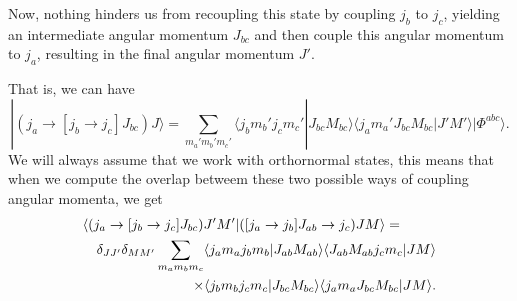 Now, nothing hinders us from recoupling this state by coupling $j_b$ to $j_c$, yielding an intermediate angular momentum $J_{bc}$ and then couple this angular momentum to $j_a$, resulting in the final angular momentum $J'$. 

That is, we can have 
\[
| (j_a\rightarrow [j_b\rightarrow j_c]J_{bc}) J\rangle = \sum_{m_a'm_b'm_c'}\langle j_bm_b'j_cm_c'|J_{bc}M_{bc}\rangle \langle j_am_a'J_{bc}M_{bc}|J'M'\rangle|\Phi^{abc}\rangle .
\]
We will always assume that we work with orthornormal states, this means that when we compute the overlap betweem these two possible ways of coupling angular momenta, we get 
\begin{eqnarray}
\nonumber
\lefteqn{ \langle (j_a\rightarrow [j_b\rightarrow j_c]J_{bc}) J'M'| ([j_a\rightarrow j_b]J_{ab}\rightarrow j_c) JM\rangle = } \\
\nonumber
& & \delta_{JJ'}\delta_{MM'}\sum_{m_am_bm_c}\langle j_am_aj_bm_b|J_{ab}M_{ab}\rangle \langle J_{ab}M_{ab}j_cm_c|JM\rangle \\
& & \times \langle j_bm_bj_cm_c|J_{bc}M_{bc}\rangle \langle j_am_aJ_{bc}M_{bc}|JM\rangle . \nonumber
\end{eqnarray}

